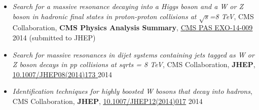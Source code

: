 \documentclass[12pt,oneside,final]{thesis}
\begin{document}
\begin{vita}
\begin{itemize}

\item \textit{Search for a massive resonance decaying into a Higgs boson and a W or Z boson in hadronic final states in proton-proton collisions at $\sqrt{s}$=8 TeV}, CMS Collaboration, 
\textbf{CMS Physics Analysis Summary}, \href{http://arxiv.org/abs/1506.01443}
{\color{blue} \underline{CMS PAS EXO-14-009}} 2014 (submitted to JHEP)

\item \textit{Search for massive resonances in dijet systems containing jets tagged as W or Z boson decays in pp collisions at sqrt{s} = 8 TeV}, CMS Collaboration, \textbf{JHEP}, 
\href{http://arxiv.org/abs/1405.1994}{\color{blue} \underline{10.1007/JHEP08(2014)173} } 2014

\item \textit{Identification techniques for highly boosted W bosons that decay into hadrons}, 
CMS Collaboration, \textbf{JHEP}, \href{http://arxiv.org/abs/1410.4227}{\color{blue}\underline{
10.1007/JHEP12(2014)017}} 2014

\end{itemize}

\end{vita}
\end{document}
